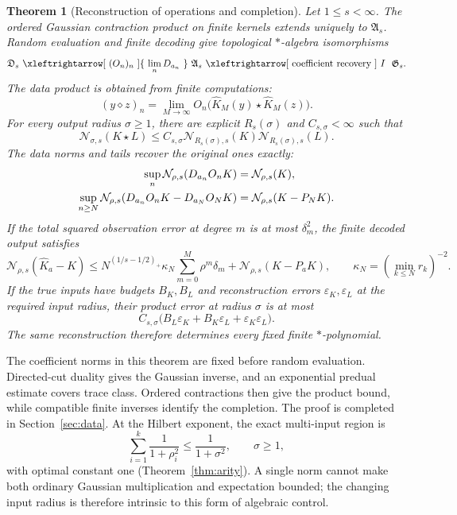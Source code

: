 \documentclass[11pt,a4paper]{amsart}
\numberwithin{equation}{section}
\newtheorem{theorem}{Theorem}[section]
\theoremstyle{definition}
\theoremstyle{remark}
\newcommand{\Alg}{\mathfrak A}
\newcommand{\Data}{\mathfrak D}
\newcommand{\Gaus}{\mathfrak G}
\newcommand{\Nn}[2]{\mathcal N_{#1,s}(#2)}
\begin{document}
\begin{theorem}[Reconstruction of operations and completion]\label{thm:main}
Let $1\le s<\infty$. The ordered Gaussian contraction product on finite kernels extends uniquely to $\Alg_s$. Random evaluation and finite decoding give topological $*$-algebra isomorphisms
\begin{equation}\label{eq:main-diagram}
 \Data_s\ \xleftrightarrow[\ (O_n)_n\ ]{\ \lim_nD_{a_n}\ }\
 \Alg_s\ \xleftrightarrow[\ \text{coefficient recovery}\ ]{\ I\ }\ \Gaus_s.
\end{equation}
The data product is obtained from finite computations:
\[
 (y\diamond z)_n=\lim_{M\to\infty}
 O_n\big(\widehat K_M(y)\star\widehat K_M(z)\big).
\]
For every output radius $\sigma\ge1$, there are explicit $R_s(\sigma)$ and $C_{s,\sigma}<\infty$ such that
\begin{equation}\label{eq:intro-product}
 \Nn\sigma{K\star L}
 \le C_{s,\sigma}\Nn{R_s(\sigma)}K\Nn{R_s(\sigma)}L.
\end{equation}
The data norms and tails recover the original ones exactly:
\begin{align}\label{eq:intro-tail-identity}
 \sup_n\Nn\rho{D_{a_n}O_nK}&=\Nn\rho K,\notag\\
 \sup_{n\ge N}\Nn\rho{D_{a_n}O_nK-D_{a_N}O_NK}
 &=\Nn\rho{K-P_NK}.
\end{align}
If the total squared observation error at degree $m$ is at most $\delta_m^2$, the finite decoded output satisfies
\begin{equation}\label{eq:intro-noise}
 \Nn\rho{\widehat K_a-K}
 \le N^{(1/s-1/2)_+}\kappa_N\sum_{m=0}^M\rho^m\delta_m
       +\Nn\rho{K-P_aK},\qquad
 \kappa_N=(\min_{k\le N}r_k)^{-2}.
\end{equation}
If the true inputs have budgets $B_K,B_L$ and reconstruction errors $\varepsilon_K,\varepsilon_L$ at the required input radius, their product error at radius $\sigma$ is at most
\begin{equation}\label{eq:intro-bilinearerror}
 C_{s,\sigma}\big(B_L\varepsilon_K+B_K\varepsilon_L+
                  \varepsilon_K\varepsilon_L\big).
\end{equation}
The same reconstruction therefore determines every fixed finite $*$-polynomial.
\end{theorem}


The coefficient norms in this theorem are fixed before random evaluation. Directed-cut duality gives the Gaussian inverse, and an exponential predual estimate covers trace class. Ordered contractions then give the product bound, while compatible finite inverses identify the completion. The proof is completed in Section~\ref{sec:data}. At the Hilbert exponent, the exact multi-input region is
\begin{equation}\label{eq:intro-arity}
 \sum_{i=1}^k\frac1{1+\rho_i^2}\le\frac1{1+\sigma^2},\qquad\sigma\ge1,
\end{equation}
with optimal constant one (Theorem~\ref{thm:arity}). A single norm cannot make both ordinary Gaussian multiplication and expectation bounded; the changing input radius is therefore intrinsic to this form of algebraic control.
\end{document}
